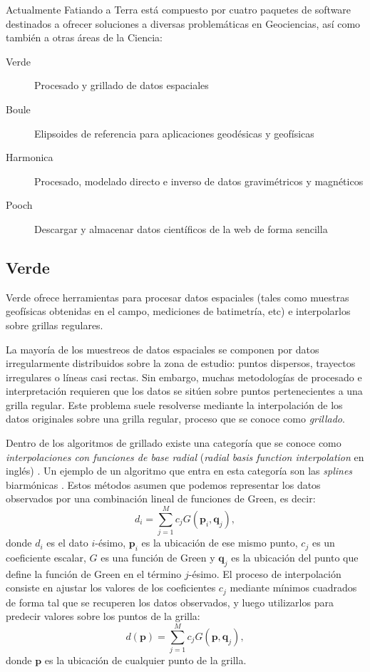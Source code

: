 Actualmente Fatiando a Terra está compuesto por cuatro paquetes de software
destinados a ofrecer soluciones a diversas problemáticas en Geociencias, así
como también a otras áreas de la Ciencia:

\begin{description}
    \item[Verde]{%
        Procesado y grillado de datos espaciales
    }
    \item[Boule]{%
        Elipsoides de referencia para aplicaciones geodésicas y geofísicas
    }
    \item[Harmonica]{%
        Procesado, modelado directo e inverso de datos gravimétricos
        y magnéticos
    }
    \item[Pooch]{%
        Descargar y almacenar datos científicos de la web de forma sencilla
    }
\end{description}

\subsection{Verde}

Verde ofrece herramientas para procesar datos espaciales (tales como
muestras geofísicas obtenidas en el campo, mediciones de batimetría, etc)
e interpolarlos sobre grillas regulares.

La mayoría de los muestreos de datos espaciales se componen por datos
irregularmente distribuidos sobre la zona de estudio:
puntos dispersos, trayectos irregulares o líneas casi rectas.
Sin embargo, muchas metodologías de procesado e interpretación requieren que
los datos se sitúen sobre puntos pertenecientes a una grilla regular.
Este problema suele resolverse mediante la interpolación de los datos
originales sobre una grilla regular, proceso que se conoce como
\emph{grillado}.

Dentro de los algoritmos de grillado existe una categoría que se conoce como
\emph{interpolaciones con funciones de base radial} (\emph{radial basis
function interpolation} en inglés) \citep{franke1982}.
Un ejemplo de un algoritmo que entra en esta categoría son las \emph{splines}
biarmónicas \citep{sandwell1987}.
Estos métodos asumen que podemos representar los datos observados por una
combinación lineal de funciones de Green, es decir:
%
\begin{equation}
    d_i = \sum_{j=1}^M c_j G(\mathbf{p}_i, \mathbf{q}_j),
\end{equation}
%
donde $d_i$ es el dato $i$-ésimo, $\mathbf{p}_i$ es la ubicación de
ese mismo punto, $c_j$ es un coeficiente escalar, $G$ es una función de Green y
$\mathbf{q}_j$ es la ubicación del punto que define la función de Green en el
término $j$-ésimo.
El proceso de interpolación consiste en ajustar los valores de los
coeficientes $c_j$ mediante mínimos cuadrados de forma tal que se recuperen los
datos observados, y luego utilizarlos para predecir valores sobre los puntos de
la grilla:
%
\begin{equation}
    d(\mathbf{p}) = \sum_{j=1}^M c_j G(\mathbf{p}, \mathbf{q}_j),
\end{equation}
%
donde $\mathbf{p}$ es la ubicación de cualquier punto de la grilla.

